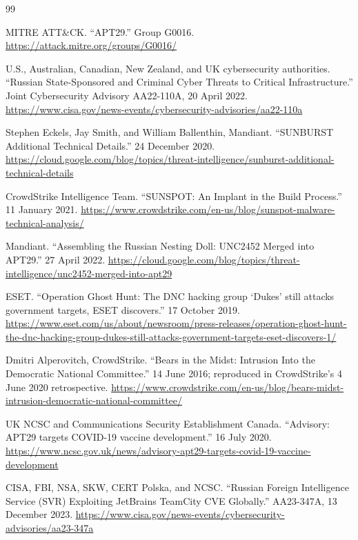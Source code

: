 {}
\begin{thebibliography}{99}

 MITRE ATT\&CK. ``APT29.'' Group G0016. \url{https://attack.mitre.org/groups/G0016/}

 U.S., Australian, Canadian, New Zealand, and UK cybersecurity authorities. ``Russian State-Sponsored and Criminal Cyber Threats to Critical Infrastructure.'' Joint Cybersecurity Advisory AA22-110A, 20 April 2022. \url{https://www.cisa.gov/news-events/cybersecurity-advisories/aa22-110a}

 Stephen Eckels, Jay Smith, and William Ballenthin, Mandiant. ``SUNBURST Additional Technical Details.'' 24 December 2020. \url{https://cloud.google.com/blog/topics/threat-intelligence/sunburst-additional-technical-details}

 CrowdStrike Intelligence Team. ``SUNSPOT: An Implant in the Build Process.'' 11 January 2021. \url{https://www.crowdstrike.com/en-us/blog/sunspot-malware-technical-analysis/}

 Mandiant. ``Assembling the Russian Nesting Doll: UNC2452 Merged into APT29.'' 27 April 2022. \url{https://cloud.google.com/blog/topics/threat-intelligence/unc2452-merged-into-apt29}

 ESET. ``Operation Ghost Hunt: The DNC hacking group `Dukes' still attacks government targets, ESET discovers.'' 17 October 2019. \url{https://www.eset.com/us/about/newsroom/press-releases/operation-ghost-hunt-the-dnc-hacking-group-dukes-still-attacks-government-targets-eset-discovers-1/}

 Dmitri Alperovitch, CrowdStrike. ``Bears in the Midst: Intrusion Into the Democratic National Committee.'' 14 June 2016; reproduced in CrowdStrike's 4 June 2020 retrospective. \url{https://www.crowdstrike.com/en-us/blog/bears-midst-intrusion-democratic-national-committee/}

 UK NCSC and Communications Security Establishment Canada. ``Advisory: APT29 targets COVID-19 vaccine development.'' 16 July 2020. \url{https://www.ncsc.gov.uk/news/advisory-apt29-targets-covid-19-vaccine-development}

 CISA, FBI, NSA, SKW, CERT Polska, and NCSC. ``Russian Foreign Intelligence Service (SVR) Exploiting JetBrains TeamCity CVE Globally.'' AA23-347A, 13 December 2023. \url{https://www.cisa.gov/news-events/cybersecurity-advisories/aa23-347a}


\end{thebibliography}
